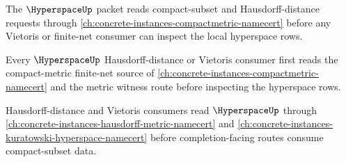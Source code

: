 The $\HyperspaceUp$ packet reads compact-subset and Hausdorff-distance requests through \autoref{ch:concrete-instances-compactmetric-namecert} before any Vietoris or finite-net consumer can inspect the local hyperspace rows.

Every $\HyperspaceUp$ Hausdorff-distance or Vietoris consumer first reads the compact-metric finite-net source of \autoref{ch:concrete-instances-compactmetric-namecert} and the metric witness route before inspecting the hyperspace rows.

Hausdorff-distance and Vietoris consumers read $\HyperspaceUp$ through \autoref{ch:concrete-instances-hausdorff-metric-namecert} and \autoref{ch:concrete-instances-kuratowski-hyperspace-namecert} before completion-facing routes consume compact-subset data.















